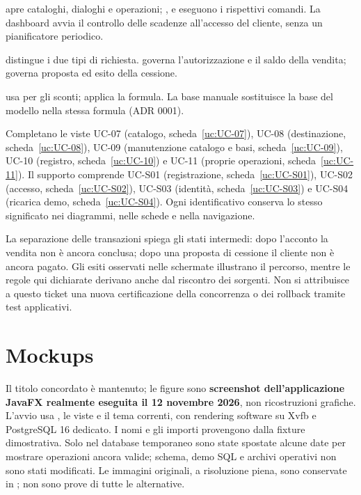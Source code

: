 \begin{description}[style=nextline]\raggedright
\item[UC-01, UC-02 e UC-03.]
 apre cataloghi, dialoghi e operazioni;
,  e 
eseguono i rispettivi comandi. La dashboard avvia il controllo delle
scadenze all'accesso del cliente, senza un pianificatore periodico.
\item[UC-04 e UC-05.]
 distingue i due tipi di richiesta.
 governa l'autorizzazione e il saldo della vendita;
 governa proposta ed esito della cessione.
\item[UC-06.]
 usa  per gli sconti;
 applica la formula. La base manuale
sostituisce la base del modello nella stessa formula (ADR 0001).
\end{description}

Completano le viste UC-07 (catalogo, scheda~\ref{uc:UC-07}), UC-08
(destinazione, scheda~\ref{uc:UC-08}), UC-09 (manutenzione catalogo e basi,
scheda~\ref{uc:UC-09}), UC-10 (registro, scheda~\ref{uc:UC-10}) e UC-11
(proprie operazioni, scheda~\ref{uc:UC-11}). Il supporto comprende UC-S01
(registrazione, scheda~\ref{uc:UC-S01}), UC-S02 (accesso,
scheda~\ref{uc:UC-S02}), UC-S03 (identit\`a, scheda~\ref{uc:UC-S03}) e
UC-S04 (ricarica demo, scheda~\ref{uc:UC-S04}). Ogni identificativo conserva
lo stesso significato nei diagrammi, nelle schede e nella navigazione.

La separazione delle transazioni spiega gli stati intermedi: dopo l'acconto
la vendita non \`e ancora conclusa; dopo una proposta di cessione il cliente
non \`e ancora pagato. Gli esiti osservati nelle schermate illustrano il
percorso, mentre le regole qui dichiarate derivano anche dal riscontro dei
sorgenti. Non si attribuisce a questo ticket una nuova certificazione della
concorrenza o dei rollback tramite test applicativi.
\clearpage

\section{Mockups}\label{sec:mockups}
Il titolo concordato \`e mantenuto; le figure sono \textbf{screenshot
dell'applicazione JavaFX realmente eseguita il 12 novembre 2026}, non
ricostruzioni grafiche. L'avvio usa , le viste e il tema
correnti, con rendering software su Xvfb e PostgreSQL 16 dedicato.
I nomi e gli importi provengono dalla fixture dimostrativa. Solo nel database
temporaneo sono state spostate alcune date per mostrare operazioni ancora
valide; schema, demo SQL e archivi operativi non sono stati modificati.
Le immagini originali, a risoluzione piena, sono conservate in
; non sono prove di tutte le alternative.

